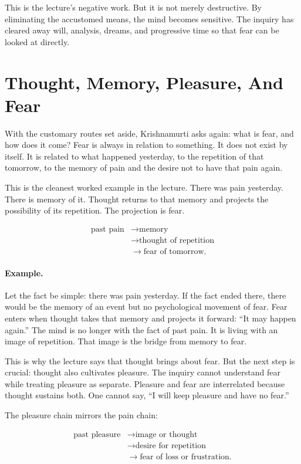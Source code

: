 This is the lecture's negative work. But it is not merely destructive. By eliminating the accustomed means, the mind becomes sensitive. The inquiry has cleared away will, analysis, dreams, and progressive time so that fear can be looked at directly.

\section{Thought, Memory, Pleasure, And Fear}

With the customary routes set aside, Krishnamurti asks again: what is fear, and how does it come? Fear is always in relation to something. It does not exist by itself. It is related to what happened yesterday, to the repetition of that tomorrow, to the memory of pain and the desire not to have that pain again.

This is the cleanest worked example in the lecture. There was pain yesterday. There is memory of it. Thought returns to that memory and projects the possibility of its repetition. The projection is fear.

\begin{align}
\text{past pain}
&\longrightarrow \text{memory} \\
&\longrightarrow \text{thought of repetition} \\
&\longrightarrow \text{fear of tomorrow}.
\end{align}

\paragraph{Example.} Let the fact be simple: there was pain yesterday. If the fact ended there, there would be the memory of an event but no psychological movement of fear. Fear enters when thought takes that memory and projects it forward: ``It may happen again.'' The mind is no longer with the fact of past pain. It is living with an image of repetition. That image is the bridge from memory to fear.

This is why the lecture says that thought brings about fear. But the next step is crucial: thought also cultivates pleasure. The inquiry cannot understand fear while treating pleasure as separate. Pleasure and fear are interrelated because thought sustains both. One cannot say, ``I will keep pleasure and have no fear.''

The pleasure chain mirrors the pain chain:

\begin{align}
\text{past pleasure}
&\longrightarrow \text{image or thought} \\
&\longrightarrow \text{desire for repetition} \\
&\longrightarrow \text{fear of loss or frustration}.
\end{align}

